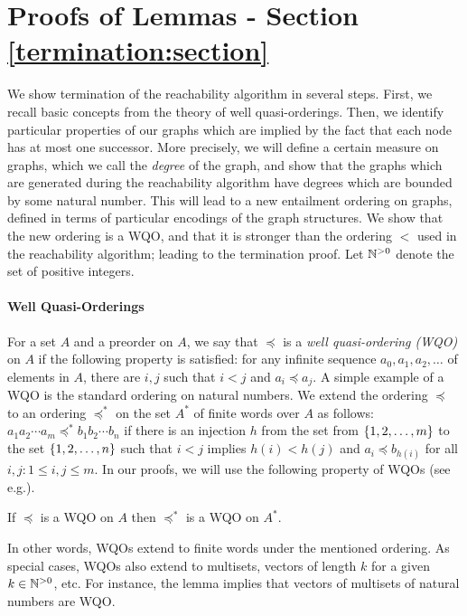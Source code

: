 \section{Proofs of Lemmas - Section \ref{termination:section}}
\label{encoding:section}
We show termination of the reachability algorithm
in several steps.
%
First, we recall basic concepts from the theory of well quasi-orderings.
%
Then, we identify particular properties of our graphs which are implied by
the fact that each node has at most one successor.
%
More precisely, we will define a certain measure on graphs,
which we call the {\it degree} of the graph, and show that
the graphs which are generated during the reachability algorithm 
have degrees which are bounded by some natural number.
%
This will lead to a new entailment ordering on graphs, defined in terms
of particular encodings of the graph structures.
%
We show that the new ordering is a WQO, and that it is stronger than the ordering $\lt$
used in the reachability algorithm; leading to the termination proof.
%
Let ${\mathbb N}^{>0}$ denote the set of positive integers.

\paragraph{\bf Well Quasi-Orderings}
For a set $A$ and a preorder on $A$, we say that $\preceq$ is 
a {\it well quasi-ordering (WQO)} on $A$ if the following property is
satisfied:
for any infinite sequence $a_0,a_1,a_2,\ldots$ of elements in $A$, there are 
$i,j$  such that $i<j$ and $a_i\preceq a_j$.
%
A simple example of a WQO is the standard ordering on natural numbers.
%
We extend the ordering $\preceq$ to an ordering $\preceq^*$ on
the set $A^*$ of finite words over $A$ as follows:
$a_1 a_2\cdots a_m\preceq^* b_1 b_2\cdots b_n$ if there is an injection $h$
from the set
from $\left\{1,2,\ldots,m\right\}$ to the set $\left\{1,2,\ldots,n\right\}$ such that
$i<j$ implies $h(i)<h(j)$ and $a_i\preceq b_{h(i)}$ for all $i,j:1\leq i,j\leq m$.
%
In our proofs, we will use the following property of WQOs (see e.g.\cite{ACJT00}).
%
\begin{lemma}
\label{WQO:properties:lemma}
If $\preceq$ is a WQO on $A$ then $\preceq^*$ is a WQO on $A^*$.
\end{lemma}
In other words, WQOs extend to finite words under the mentioned ordering.
%
As special cases, WQOs also extend to multisets, vectors of length $k$ for a given
$k\in{\mathbb N}^{>0}$, etc.
%
For instance, the lemma implies that vectors of multisets of natural numbers are WQO.
%


